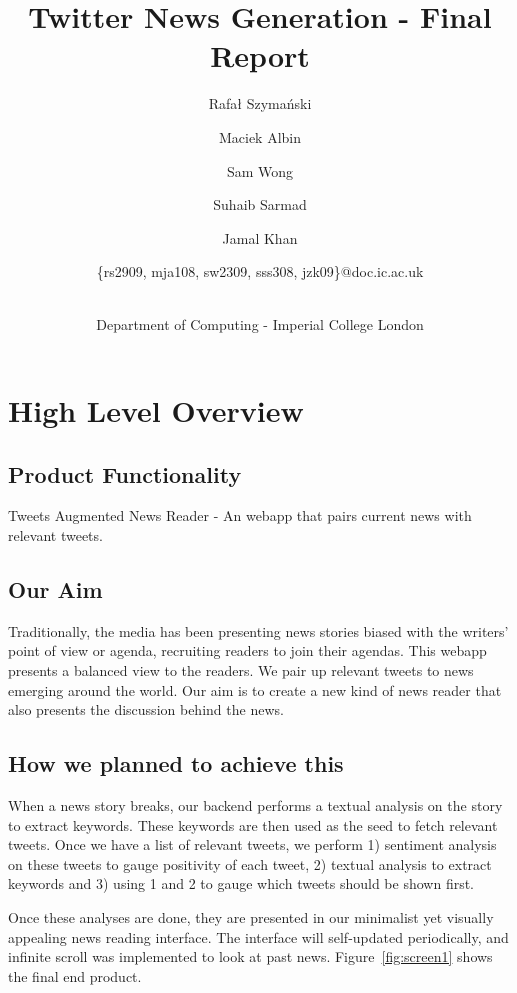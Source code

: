 \documentclass{report}
\title{Twitter News Generation - Final Report}
\author{
    \small{Rafał Szymański}\\
  	\and
    \small{Maciek Albin}\\
    \and
    \small{Sam Wong}\\
    \and  
    \small{Suhaib Sarmad}\\
		\and
		\small{Jamal Khan}\\
		\and
		\small{\{rs2909, mja108, sw2309, sss308, jzk09\}@doc.ic.ac.uk}
		\and
		\\Department of Computing - Imperial College London
}
\begin{document}
 
	\maketitle
	\tableofcontents
	\newpage

	\chapter{High Level Overview}
	
	\section{Product Functionality}
	
	Tweets Augmented News Reader - An webapp that pairs current news with relevant tweets.

	\section{Our Aim}

	Traditionally, the media has been presenting news stories biased with the writers’ point of view or agenda, recruiting readers to join their agendas. This webapp presents a balanced view to the readers. We pair up relevant tweets to news emerging around the world. Our aim is to create a new kind of news reader that also presents the discussion behind the news. 
	
	\section{How we planned to achieve this}

	When a news story breaks, our backend performs a textual analysis on the story to extract keywords. These keywords are then used as the seed to fetch relevant tweets. Once we have a list of relevant tweets, we perform 1) sentiment analysis on these tweets to gauge positivity of each tweet, 2) textual analysis to extract keywords and 3) using 1 and 2 to gauge which tweets should be shown first.

	Once these analyses are done, they are presented in our minimalist yet visually appealing news reading interface. The interface will self-updated periodically, and infinite scroll was implemented to look at past news. Figure~\ref{fig:screen1} shows the final end product.
\end{document}
